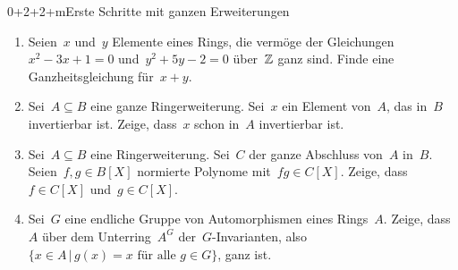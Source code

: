 \documentclass{uebblatt}
\begin{document}
\begin{aufgabe}{0+2+2+m}{Erste Schritte mit ganzen Erweiterungen}
\begin{enumerate}
\item Seien~$x$ und~$y$ Elemente eines Rings, die vermöge der
Gleichungen~$x^2-3x+1=0$ und~$y^2+5y-2=0$ über~$\mathbb{Z}$ ganz sind. Finde eine
Ganzheitsgleichung für~$x+y$.
\item Sei~$A \subseteq B$ eine ganze Ringerweiterung. Sei~$x$ ein Element
von~$A$, das in~$B$ invertierbar ist. Zeige, dass~$x$ schon in~$A$ invertierbar ist.
\item Sei~$A \subseteq B$ eine Ringerweiterung. Sei~$C$ der ganze Abschluss
von~$A$ in~$B$. Seien~$f,g \in B[X]$ normierte Polynome mit~$fg \in C[X]$.
Zeige, dass~$f \in C[X]$ und~$g \in C[X]$.
\item Sei~$G$ eine endliche Gruppe von Automorphismen eines Rings~$A$. Zeige,
dass~$A$ über dem Unterring~$A^G$ der~$G$-Invarianten, also~$\{ x \in A \,|\, \text{$g(x)=x$ für
alle $g \in G$} \}$, ganz ist.
\end{enumerate}
\end{aufgabe}
\end{document}
